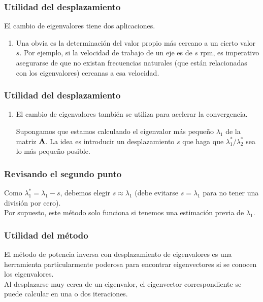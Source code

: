 \documentclass[12pt]{beamer}
\begin{document}
\begin{frame}
\frametitle{Utilidad del desplazamiento}
El cambio de eigenvalores tiene dos aplicaciones.
\pause
{}
\begin{enumerate}
\item Una obvia es la determinación del valor propio más cercano a un cierto valor $s$.
\pause
Por ejemplo, si la velocidad de trabajo de un eje es de $s$ rpm, es imperativo asegurarse de que no existan frecuencias naturales (que están relacionadas con los eigenvalores) cercanas a esa velocidad.
\seti
\end{enumerate}
\end{frame}
\begin{frame}
\frametitle{Utilidad del desplazamiento}
\begin{enumerate}
\conti 
\item El cambio de eigenvalores también se utiliza para acelerar la convergencia.

Supongamos que estamos calculando el eigenvalor más pequeño $\lambda_{1}$ de la matriz $\vb{A}$. \pause La idea es introducir un desplazamiento $s$ que haga que $\lambda_{1}^{*}/\lambda_{2}^{*}$ sea lo más pequeño posible.
\end{enumerate}
\end{frame}
\begin{frame}
\frametitle{Revisando el segundo punto}
Como $\lambda_{1}^{*} = \lambda_{1} - s$, debemos elegir $s \approx \lambda_{1}$ (debe evitarse $s = \lambda_{1}$ para no tener una división por cero). 
\\
\bigskip
\pause
Por supuesto, este método solo funciona si tenemos una estimación previa de $\lambda_{1}$.
\end{frame}
\begin{frame}
\frametitle{Utilidad del método}
El método de potencia inversa con desplazamiento de eigenvalores es una herramienta particularmente poderosa para encontrar eigenvectores si se conocen los eigenvalores.
\\
\bigskip
\pause
Al desplazarse muy cerca de un eigenvalor, el eigenvector correspondiente se puede calcular en una o dos iteraciones.
\end{frame}
\end{document}
